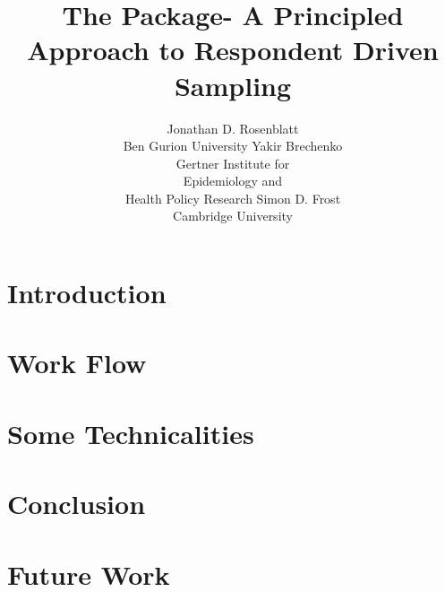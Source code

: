 \documentclass[article]{jss}
\author{Jonathan D. Rosenblatt\\Ben Gurion University \And 
        Yakir Brechenko\\ Gertner Institute for \\ Epidemiology and \\ Health Policy Research \And
        Simon D. Frost\\ Cambridge University}
\title{The \pkg{chords} \proglang{R} Package- A Principled Approach to Respondent Driven Sampling}
\begin{document}

\section{Introduction}

\section{Work Flow}

\section{Some Technicalities}

\section{Conclusion}

\section{Future Work}




\end{document}
